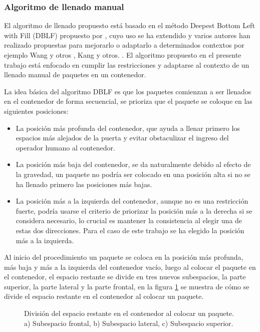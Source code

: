 \subsubsection{Algoritmo de llenado manual}

El algoritmo de llenado propuesto está basado en el método Deepest Bottom Left with Fill (DBLF) propuesto por \cite{karabulut2004hybrid}, cuyo uso se ha extendido y varios autores han realizado propuestas para mejorarlo o adaptarlo a determinados contextos por ejemplo Wang y otros \cite{wang2010hybrid}, Kang y otros. \cite{kang2012hybrid}. El algoritmo propuesto en el presente trabajo está enfocado en cumplir las restricciones y adaptarse al contexto de un llenado manual de paquetes en un contenedor.

La idea básica del algoritmo DBLF es que los paquetes comienzan a ser llenados en el contenedor de forma secuencial, se prioriza que el paquete se coloque en las siguientes posiciones:

\begin{itemize}
    \item La posición más profunda del contenedor, que ayuda a llenar primero los espacios más alejados de la puerta y evitar obstaculizar el ingreso del operador humano al contenedor.
    \item La posición más baja del contenedor, se da naturalmente debido al efecto de la gravedad, un paquete no podría ser colocado en una posición alta si no se ha llenado primero las posiciones más bajas.
    \item La posición más a la izquierda del contenedor, aunque no es una restricción fuerte, podría usarse el criterio de priorizar la posición más a la derecha si se considera necesario, lo crucial es mantener la consistencia al elegir una de estas dos direcciones. Para el caso de este trabajo se ha elegido la posición más a la izquierda.
\end{itemize}

Al inicio del procedimiento un paquete se coloca en la posición más profunda, más baja y más a la izquierda del contenedor vacío, luego al colocar el paquete en el contenedor, el espacio restante se divide en tres nuevos subespacios, la parte superior, la parte lateral y la parte frontal, en la figura \ref{fig:subespacios} se muestra de cómo se divide el espacio restante en el contenedor al colocar un paquete.

\begin{figure}[H]
    \centering
    
    \caption{División del espacio restante en el contenedor al colocar un paquete. a) Subespacio frontal, b) Subespacio lateral, c) Subespacio superior.}
    \label{fig:subespacios}
\end{figure}

